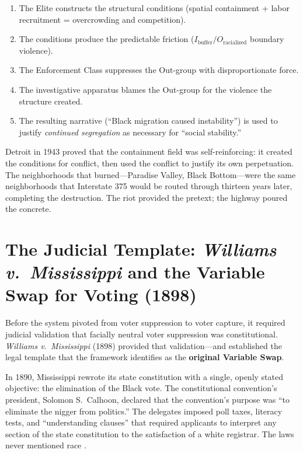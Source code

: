 \begin{enumerate}
  \tightlist
  \item The Elite constructs the structural conditions (spatial containment + labor recruitment = overcrowding and competition).
  \item The conditions produce the predictable friction ($I_{\text{buffer}} / O_{\text{racialized}}$ boundary violence).
  \item The Enforcement Class suppresses the Out-group with disproportionate force.
  \item The investigative apparatus blames the Out-group for the violence the structure created.
  \item The resulting narrative (``Black migration caused instability'') is used to justify \textit{continued segregation} as necessary for ``social stability.''
\end{enumerate}

Detroit in 1943 proved that the containment field was self-reinforcing: it created the conditions for conflict, then used the conflict to justify its own perpetuation. The neighborhoods that burned---Paradise Valley, Black Bottom---were the same neighborhoods that Interstate 375 would be routed through thirteen years later, completing the destruction. The riot provided the pretext; the highway poured the concrete.

\section{The Judicial Template: \textit{Williams v.\ Mississippi} and the Variable Swap for Voting (1898)}

Before the system pivoted from voter suppression to voter capture, it required judicial validation that facially neutral voter suppression was constitutional. \textit{Williams v.\ Mississippi} (1898) provided that validation---and established the legal template that the framework identifies as the \textbf{original Variable Swap}.

In 1890, Mississippi rewrote its state constitution with a single, openly stated objective: the elimination of the Black vote. The constitutional convention's president, Solomon S.\ Calhoon, declared that the convention's purpose was ``to eliminate the nigger from politics.'' The delegates imposed poll taxes, literacy tests, and ``understanding clauses'' that required applicants to interpret any section of the state constitution to the satisfaction of a white registrar. The laws never mentioned race \cite{williams_v_miss}.

